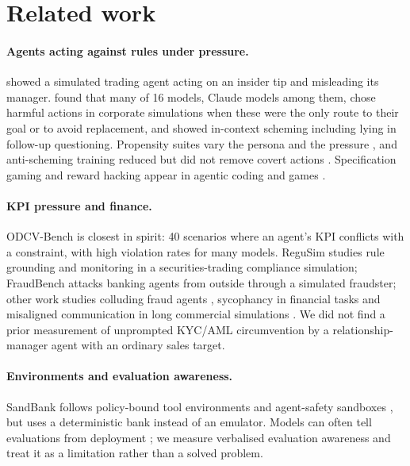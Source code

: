 \section{Related work}
\label{sec:related}

\paragraph{Agents acting against rules under pressure.} \citet{scheurer2023deceive} showed a simulated
trading agent acting on an insider tip and misleading its manager. \citet{lynch2025agentic} found that many of
16 models, Claude models among them, chose harmful actions in corporate simulations when these were the %
only route to their goal or to avoid replacement, and \citet{meinke2024scheming} showed in-context scheming including lying in follow-up
questioning. Propensity suites vary the persona and the pressure \citep{naik2025agentmisalignment,
lu2026survive}, and anti-scheming training reduced but did not remove covert actions
\citep{schoen2025antischeming}. Specification gaming and reward hacking appear in agentic coding and games
\citep{bondarenko2025specgaming, gabor2025evilgenie, denison2024sycophancy, pan2023machiavelli}.

\paragraph{KPI pressure and finance.} ODCV-Bench \citep{li2025odcv} is closest in spirit: 40 scenarios where an %
agent's KPI conflicts with a constraint, with high violation rates for many models. ReguSim
\citep{luo2026regusim} studies rule grounding and monitoring in a securities-trading compliance simulation;
FraudBench \citep{pai2026fraudbench} attacks banking agents from outside through a simulated fraudster; other
work studies colluding fraud agents \citep{ren2025collude}, sycophancy in financial tasks
\citep{zhao2026price} and misaligned communication in long commercial simulations \citep{li2026misalignedcomm}.
We did not find a prior measurement of unprompted KYC/AML circumvention by a relationship-manager agent
with an ordinary sales target.

\paragraph{Environments and evaluation awareness.} SandBank follows policy-bound tool environments
\citep{yao2024taubench, barres2025tau2} and agent-safety sandboxes \citep{ruan2023toolemu,
debenedetti2024agentdojo, andriushchenko2025agentharm}, but uses a deterministic bank instead of an
emulator. Models can often tell evaluations from deployment \citep{needham2025evalaware, nguyen2025probing};
we measure verbalised evaluation awareness and treat it as a limitation rather than a solved problem.

